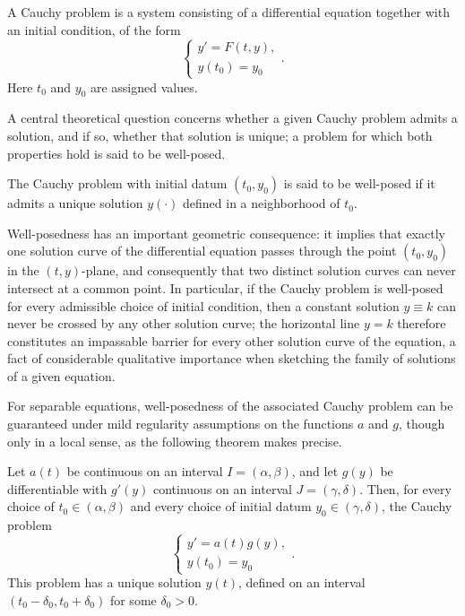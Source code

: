 \begin{definition}
A Cauchy problem is a system consisting of a differential equation together with an initial condition, of the form
\[
\begin{cases}
y' = F(t,y), \\
y(t_0) = y_0
\end{cases}.
\]
Here $t_0$ and $y_0$ are assigned values.
\end{definition}

A central theoretical question concerns whether a given Cauchy problem admits a solution, and if so, whether that solution is unique; a problem for which both properties hold is said to be well-posed.

\begin{definition}
The Cauchy problem with initial datum $(t_0, y_0)$ is said to be well-posed if it admits a unique solution $y(\cdot)$ defined in a neighborhood of $t_0$.
\end{definition}

Well-posedness has an important geometric consequence: it implies that exactly one solution curve of the differential equation passes through the point $(t_0, y_0)$ in the $(t,y)$-plane, and consequently that two distinct solution curves can never intersect at a common point. In particular, if the Cauchy problem is well-posed for every admissible choice of initial condition, then a constant solution $y \equiv k$ can never be crossed by any other solution curve; the horizontal line $y = k$ therefore constitutes an impassable barrier for every other solution curve of the equation, a fact of considerable qualitative importance when sketching the family of solutions of a given equation.

For separable equations, well-posedness of the associated Cauchy problem can be guaranteed under mild regularity assumptions on the functions $a$ and $g$, though only in a local sense, as the following theorem makes precise.

\begin{theorem}
Let $a(t)$ be continuous on an interval $I = (\alpha, \beta)$, and let $g(y)$ be differentiable with $g'(y)$ continuous on an interval $J = (\gamma, \delta)$. Then, for every choice of $t_0 \in (\alpha,\beta)$ and every choice of initial datum $y_0 \in (\gamma,\delta)$, the Cauchy problem
\[
\begin{cases}
y' = a(t) g(y), \\
y(t_0) = y_0
\end{cases}.
\]
This problem has a unique solution $y(t)$, defined on an interval $(t_0 - \delta_0, t_0 + \delta_0)$ for some $\delta_0 > 0$.
\end{theorem}


